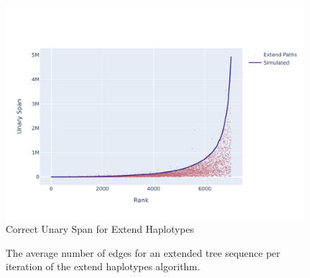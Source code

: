 \documentclass[10pt,twoside,lineno]{gsajnl}
\begin{document}
\begin{figure}
	\includegraphics[width=0.9\linewidth]{newplots_wo_ee/better_unary_spans_ep_notlog.pdf}
	\caption{Correct Unary Span for Extend Haplotypes}
	\label{fig:correct-unary-span}
\end{figure}

\begin{figure}
	\caption{The average number of edges for an extended tree sequence per iteration of the extend haplotypes algorithm.}
	\label{fig:edges-per-iteration}
\end{figure}



%
\end{document}

